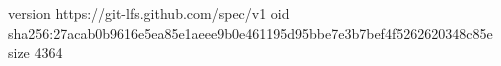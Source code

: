 version https://git-lfs.github.com/spec/v1
oid sha256:27acab0b9616e5ea85e1aeee9b0e461195d95bbe7e3b7bef4f5262620348c85e
size 4364
